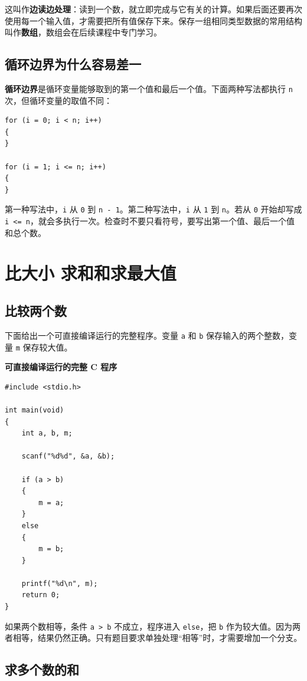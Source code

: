 \documentclass[UTF8,zihao=-4,fontset=windows]{ctexart}
\newcommand{\term}[1]{\textbf{\color{navy}#1}}
\newcommand{\clabel}{\noindent\textbf{可直接编译运行的完整 C 程序}\par\nopagebreak}
\begin{document}
这叫作\term{边读边处理}：读到一个数，就立即完成与它有关的计算。如果后面还要再次使用每一个输入值，才需要把所有值保存下来。保存一组相同类型数据的常用结构叫作\term{数组}，数组会在后续课程中专门学习。

\subsection{循环边界为什么容易差一}

\term{循环边界}是循环变量能够取到的第一个值和最后一个值。下面两种写法都执行 \verb|n| 次，但循环变量的取值不同：

\begin{lstlisting}[style=cstyle]
for (i = 0; i < n; i++)
{
}

for (i = 1; i <= n; i++)
{
}
\end{lstlisting}

第一种写法中，\verb|i| 从 \verb|0| 到 \verb|n - 1|。第二种写法中，\verb|i| 从 \verb|1| 到 \verb|n|。若从 \verb|0| 开始却写成 \verb|i <= n|，就会多执行一次。检查时不要只看符号，要写出第一个值、最后一个值和总个数。

\section{比大小 求和和求最大值}

\subsection{比较两个数}

下面给出一个可直接编译运行的完整程序。变量 \verb|a| 和 \verb|b| 保存输入的两个整数，变量 \verb|m| 保存较大值。

\clabel
\begin{lstlisting}[style=cstyle]
#include <stdio.h>

int main(void)
{
    int a, b, m;

    scanf("%d%d", &a, &b);

    if (a > b)
    {
        m = a;
    }
    else
    {
        m = b;
    }

    printf("%d\n", m);
    return 0;
}
\end{lstlisting}

如果两个数相等，条件 \verb|a > b| 不成立，程序进入 \verb|else|，把 \verb|b| 作为较大值。因为两者相等，结果仍然正确。只有题目要求单独处理“相等”时，才需要增加一个分支。

\subsection{求多个数的和}
\end{document}
